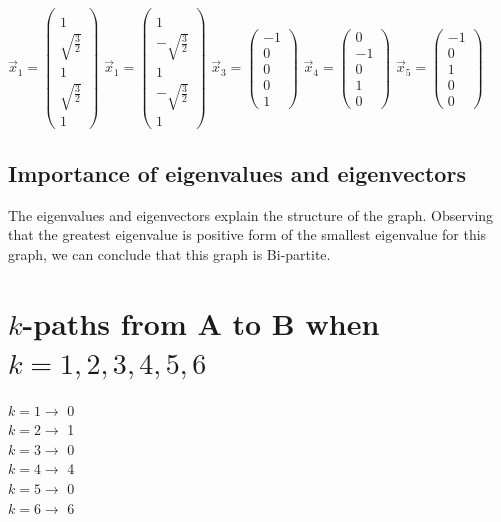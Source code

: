 \documentclass[12pt]{scrreprt}
\begin{document}
  \begin{center}
  $\vec{x}_1 = \begin{pmatrix}\\1\\\sqrt{\frac{3}{2}}\\1\\\sqrt{\frac{3}{2}}\\1\end{pmatrix}$
  $\vec{x}_1 = \begin{pmatrix}\\1\\-\sqrt{\frac{3}{2}}\\1\\-\sqrt{\frac{3}{2}}\\1\end{pmatrix}$
  $\vec{x}_3 = \begin{pmatrix}-1\\0\\0\\0\\1\end{pmatrix}$
  $\vec{x}_4 = \begin{pmatrix}0\\-1\\0\\1\\0\end{pmatrix}$
  $\vec{x}_5 = \begin{pmatrix}-1\\0\\1\\0\\0\end{pmatrix}$
  \end{center}
\subsection{Importance of eigenvalues and eigenvectors}

The eigenvalues and eigenvectors explain the structure of the graph. Observing
that the greatest eigenvalue is positive form of the smallest eigenvalue for this graph,
we can conclude that this graph is Bi-partite.

\section{$k$-paths from A to B when $k=1,2,3,4,5,6$}

\begin{center}
$k = 1 \rightarrow$ 0 \\
$k = 2 \rightarrow$ 1 \\
$k = 3 \rightarrow$ 0 \\
$k = 4 \rightarrow$ 4 \\
$k = 5 \rightarrow$ 0 \\
$k = 6 \rightarrow$ 6 \\
\end{center}
\end{document}
